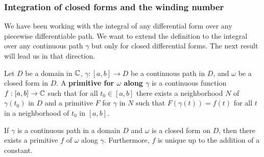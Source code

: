 \subsubsection{Integration of closed forms and the winding number}
We have been working with the integral of any differential form over any piecewise differentiable path. We want to extend the definition to the integral over any continuous path $\gamma$ but only for closed differential forms. The next result will lead us in that direction.
\begin{definition}
Let $D$ be a domain in $\mathbb{C}$, $\gamma:[a,b]\to D$ be a continuous path in $D$, and $\omega$ be a closed form in $D$. A \textbf{primitive for $\omega$ along $\gamma$} is a continuous function $f:[a,b]\to\mathbb{C}$ such that for all $t_0\in[a,b]$ there exists a neighborhood $N$ of $\gamma(t_0)$ in $D$ and a primitive $F$ for $\gamma$ in $N$ such that $F(\gamma(t))=f(t)$ for all $t$ in a neighborhood of $t_0$ in $[a,b]$.
\end{definition}
\begin{theorem}\label{complex form primitive along curve exist unique}
If $\gamma$ is a continuous path in a domain $D$ and $\omega$ is a closed form on $D$, then there exists a primitive $f$ of $\omega$ along $\gamma$. Furthermore, $f$ is unique up to the addition of a constant.
\end{theorem}
